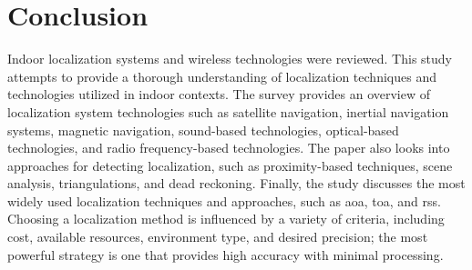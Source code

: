 \chapter{Conclusion}

Indoor localization systems and wireless technologies were reviewed.
This study attempts to provide a thorough understanding of localization techniques and technologies utilized in indoor contexts.
The survey provides an overview of localization system technologies such as satellite navigation, inertial navigation systems, magnetic navigation, sound-based technologies, optical-based technologies, and radio frequency-based technologies.
The paper also looks into approaches for detecting localization, such as proximity-based techniques, scene analysis, triangulations, and dead reckoning.
Finally, the study discusses the most widely used localization techniques and approaches, such as \acf{aoa}, \acf{toa}, and \acf{rss}.
Choosing a localization method is influenced by a variety of criteria, including cost, available resources, environment type, and desired precision; the most powerful strategy is one that provides high accuracy with minimal processing.